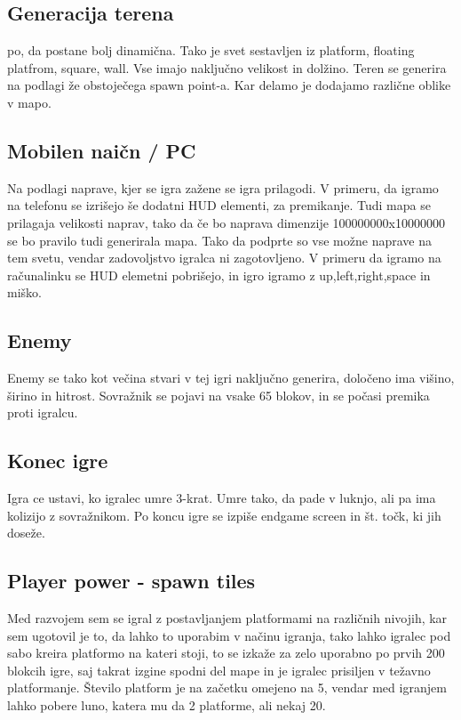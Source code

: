 \documentclass[a4paper,11pt]{article}
\begin{document}
\subsection{Generacija terena}

po, da postane bolj dinamična. Tako je svet sestavljen iz platform, floating platfrom, square, wall. Vse imajo naključno velikost in dolžino.
Teren se generira na podlagi že obstoječega spawn point-a. Kar delamo je dodajamo različne oblike v mapo.

\subsection{Mobilen naičn / PC}

Na podlagi naprave, kjer se igra zažene se igra prilagodi. V primeru, da igramo na telefonu se izrišejo še dodatni HUD elementi, za premikanje. Tudi mapa se prilagaja velikosti naprav, tako da če bo naprava dimenzije 100000000x10000000 se bo pravilo tudi generirala mapa. Tako da podprte so vse možne naprave na tem svetu, vendar zadovoljstvo igralca ni zagotovljeno. V primeru da igramo na računalinku se HUD elemetni pobrišejo, in igro igramo z up,left,right,space in miško.

\subsection{Enemy}

Enemy se tako kot večina stvari v tej igri naključno generira, določeno ima višino, širino in hitrost. Sovražnik se pojavi na vsake 65 blokov, in se počasi premika proti igralcu.

\subsection{Konec igre}

Igra ce ustavi, ko igralec umre 3-krat. Umre tako, da pade v luknjo, ali pa ima kolizijo z sovražnikom. Po koncu igre se izpiše endgame screen in št. točk, ki jih doseže.

\subsection{Player power - spawn tiles}

Med razvojem sem se igral z postavljanjem platformami na različnih nivojih, kar sem ugotovil je to, da lahko to uporabim v načinu igranja, tako lahko igralec pod sabo kreira platformo na kateri stoji, to se izkaže za zelo uporabno po prvih 200 blokcih igre, saj takrat izgine spodni del mape in je igralec prisiljen v težavno platformanje. Število platform je na začetku omejeno na 5, vendar med igranjem lahko pobere luno, katera mu da 2 platforme, ali nekaj 20.
\end{document}
